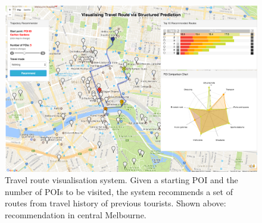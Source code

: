 \documentclass[sigconf]{acmart}
\begin{document}



\maketitle
 


 \begin{figure}
 \centering
   \includegraphics[width=\linewidth]{figure/sample_map2.png} \vspace{-20pt}
     \caption{Travel route visualisation system\protect\footnotemark. 
     Given a starting POI and the number of POIs to be visited, the system recommends a set of routes from travel history of previous tourists. Shown above: recommendation in central Melbourne.}
     \label{fig:overview}\vspace{-1.5em}
 \end{figure}

 








%
\end{document}
